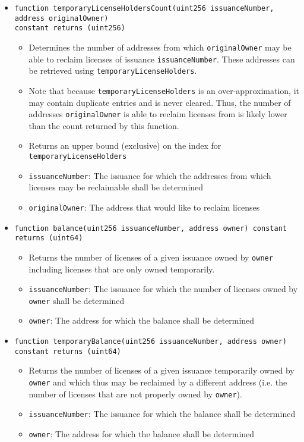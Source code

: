 \documentclass[a4paper]{article}
\begin{document}
\begin{itemize}
  \item \texttt{function temporaryLicenseHoldersCount(uint256 issuanceNumber, address originalOwner) \\constant returns (uint256)}
  \begin{itemize}
    \item Determines the number of addresses from which \texttt{originalOwner} may be able to reclaim licenses of issuance \texttt{issuanceNumber}. These addresses can be retrieved using \texttt{temporaryLicenseHolders}.
    \item Note that because \texttt{temporaryLicenseHolders} is an over-approximation, it may contain duplicate entries and is never cleared. Thus, the number of addresses \texttt{originalOwner} is able to reclaim licenses from is likely lower than the count returned by this function.
    \item Returns an upper bound (exclusive) on the index for \texttt{temporaryLicenseHolders}
    \item \texttt{issuanceNumber}: The issuance for which the addresses from which licenses may be reclaimable shall be determined
    \item \texttt{originalOwner}: The address that would like to reclaim licenses
  \end{itemize}
  
  \item \texttt{function balance(uint256 issuanceNumber, address owner) constant returns (uint64)}
  \begin{itemize}
    \item Returns the number of licenses of a given issuance owned by \texttt{owner} including licenses that are only owned temporarily.
    \item \texttt{issuanceNumber}: The issuance for which the number of licenses owned by \texttt{owner} shall be determined
    \item \texttt{owner}: The address for which the balance shall be determined
  \end{itemize}
  
  \item \texttt{function temporaryBalance(uint256 issuanceNumber, address owner) \\constant returns (uint64)}
  \begin{itemize}
    \item Returns the number of licenses of a given issuance temporarily owned by \texttt{owner} and which thus may be reclaimed by a different address (i.e. the number of licenses that are not properly owned by \texttt{owner}).
    \item \texttt{issuanceNumber}: The issuance for which the balance shall be determined
    \item \texttt{owner}: The address for which the balance shall be determined
  \end{itemize}
  

\end{itemize}
\end{document}

